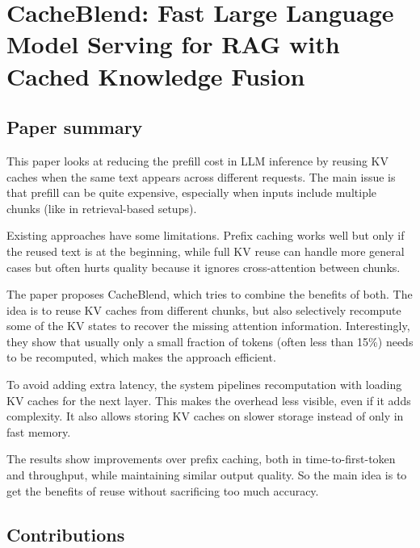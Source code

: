 \documentclass[a4paper, 12pt]{article}
\begin{document}
\section*{CacheBlend: Fast Large Language Model Serving for RAG with\\Cached Knowledge Fusion}
\subsection{Paper summary}

This paper looks at reducing the prefill cost in LLM inference by reusing KV caches when the same text appears across different requests. The main issue is that prefill can be quite expensive, especially when inputs include multiple chunks (like in retrieval-based setups).

Existing approaches have some limitations. Prefix caching works well but only if the reused text is at the beginning, while full KV reuse can handle more general cases but often hurts quality because it ignores cross-attention between chunks.

The paper proposes CacheBlend, which tries to combine the benefits of both. The idea is to reuse KV caches from different chunks, but also selectively recompute some of the KV states to recover the missing attention information. Interestingly, they show that usually only a small fraction of tokens (often less than 15\%) needs to be recomputed, which makes the approach efficient.

To avoid adding extra latency, the system pipelines recomputation with loading KV caches for the next layer. This makes the overhead less visible, even if it adds complexity. It also allows storing KV caches on slower storage instead of only in fast memory.

The results show improvements over prefix caching, both in time-to-first-token and throughput, while maintaining similar output quality. So the main idea is to get the benefits of reuse without sacrificing too much accuracy.

\subsection{Contributions}
\end{document}
